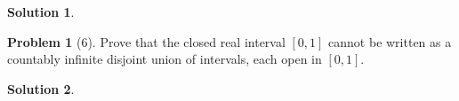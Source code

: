 \documentclass{article}
\theoremstyle{definition}
\newtheorem*{soln}{Solution}
\newtheorem*{prob}{Problem}
\theoremstyle{theorem}
\begin{document}
\begin{soln}
\begin{enumerate}
    \end{enumerate}
\end{soln}
\vspace{1in}


\begin{prob}[6]
Prove that the closed real interval $[0, 1]$ cannot be written as a countably infinite disjoint union of intervals, each open in $[0, 1]$. 
\end{prob}
\begin{soln}

\end{soln}
\vspace{1in}
\end{document}
